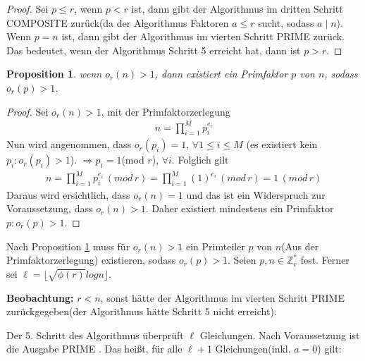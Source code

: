 \documentclass[12pt,oneside]{article}
\newtheorem{prop}{Proposition}[section]
\theoremstyle{remark}
\theoremstyle{definition}
\begin{document}
\begin{proof}
Sei $p \leq r$, wenn $p < r$ ist, dann gibt der Algorithmus im dritten Schritt COMPOSITE zurück(da der Algorithmus Faktoren $a \leq r$ sucht, sodass $a \mid n$). Wenn $p = n$ ist, dann gibt der Algorithmus im vierten Schritt PRIME zurück. Das bedeutet, wenn der Algorithmus Schritt 5 erreicht hat, dann ist $ p > r$.   
\end{proof}

\begin{prop}\label{ord_prime_l}
wenn $o_{r}(n) > 1$, dann existiert ein Primfaktor $p$ von $n$, sodass $o_{r}(p) > 1$. 
\end{prop}
\begin{proof}
Sei $o_{r}(n) > 1$, mit der Primfaktorzerlegung
\begin{align*}
    n = \prod_{i = 1}^{M} p_{i}^{e_{i}}
\end{align*}
Nun wird angenommen, dass $o_{r}(p_{i}) = 1, \, \forall 1 \leq i \leq M$ (es existiert kein $p_{i} : o_{r}(p_{i}) > 1$).\newline\newline
$\Rightarrow p_{i} = 1 $(mod $r$), $\forall i$. Folglich gilt
\begin{align*}
    n = \prod_{i = 1} ^{M} p_{i}^{e_{i}} \, (mod \, r) = \prod_{i = 1} ^{M}(1)^{e_{i}} \,  (mod \, r) = 1 \, (mod \, r)
\end{align*}
\newline\newline Daraus wird ersichtlich, dass $o_{r}(n) = 1$ und das ist ein Widerspruch zur Voraussetzung, dass $o_{r}(n) > 1$. Daher existiert mindestens ein Primfaktor $p : o_{r}(p) > 1$.  
\end{proof}

Nach Proposition \ref{ord_prime_l} muss für  $o_{r}(n) > 1$ ein Primteiler $p$ von $n$(Aus der Primfaktorzerlegung) existieren, sodass $o_{r}(p) > 1$. Seien $p,n \in \mathbb{Z}_{r}^{*}$ fest. Ferner sei  $\ell = \lfloor \sqrt{\phi(r)} log n \rfloor$.\newline

\smallskip

\textbf{\small{Beobachtung:}} $r < n$, sonst hätte der Algorithmus im vierten Schritt PRIME zurückgegeben(der Algorithmus hätte Schritt 5 nicht erreicht).\newline 

Der 5. Schritt des Algorithmus überprüft $\ell$ Gleichungen. Nach Voraussetzung ist die Ausgabe PRIME . Das heißt, für alle  $\ell + 1$  Gleichungen(inkl. $a = 0$) gilt:\newline\newline
\end{document}
